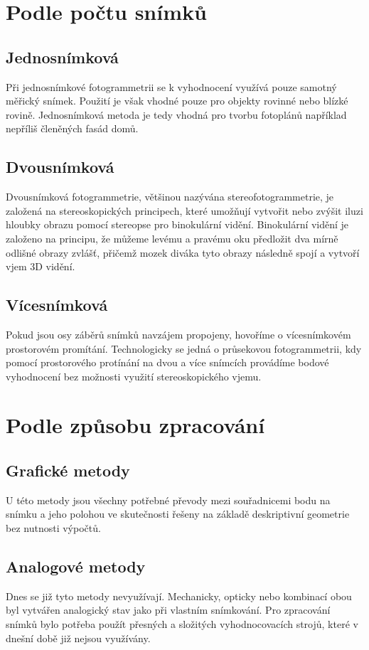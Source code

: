 \documentclass[12pt]{report}			%
\begin{document}
            \section{Podle počtu snímků}
                \subsection{Jednosnímková}
                Při jednosnímkové fotogrammetrii se k vyhodnocení využívá pouze samotný měřický snímek. Použití je však vhodné pouze pro objekty rovinné nebo blízké rovině. Jednosnímková metoda je tedy vhodná pro tvorbu fotoplánů například nepříliš členěných fasád domů.
                \subsection{Dvousnímková}
                Dvousnímková fotogrammetrie, většinou nazývána stereofotogrammetrie, je založená na stereoskopických principech, které umožňují vytvořit nebo zvýšit iluzi hloubky obrazu pomocí stereopse pro binokulární vidění. Binokulární vidění je založeno na principu, že můžeme levému a pravému oku předložit dva mírně odlišné obrazy zvlášť, přičemž mozek diváka tyto obrazy následně spojí a vytvoří vjem 3D vidění.
                \subsection{Vícesnímková}
                Pokud jsou osy záběrů snímků navzájem propojeny, hovoříme o vícesnímkovém prostorovém promítání. Technologicky se jedná o průsekovou fotogrammetrii, kdy pomocí prostorového protínání na dvou a více snímcích provádíme bodové vyhodnocení bez možnosti využití stereoskopického vjemu.
            \section{Podle způsobu zpracování}
                \subsection{Grafické metody}
                U této metody jsou všechny potřebné převody mezi souřadnicemi bodu na snímku a jeho polohou ve skutečnosti řešeny na základě deskriptivní geometrie bez nutnosti výpočtů.
                \subsection{Analogové metody}
                Dnes se již tyto metody nevyužívají. Mechanicky, opticky nebo kombinací obou byl vytvářen analogický stav jako při vlastním snímkování. Pro zpracování snímků bylo potřeba použít přesných a složitých vyhodnocovacích strojů, které v dnešní době již nejsou využívány.
\end{document}
